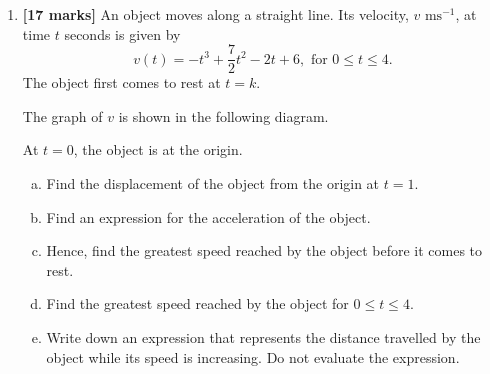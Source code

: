 \documentclass[12pt, twoside]{article}
\begin{document}
\begin{enumerate}
    Consider a geometric sequence, $v_n$, where $v_2 = u_1$ and $v_4 = u_6$.
    
    \begin{enumerate}[(a)]
        \setcounter{enumii}{3}
        \item Find the possible values of the common ratio, $r$.
        \item Given that $v_{99} < 0$, find $v_5$.
    \end{enumerate}

\vspace{1cm}

\item \textbf{[17 marks]} An object moves along a straight line. Its velocity, $v\text{ ms}^{-1}$, at time $t$ seconds is given by
\[
v(t) = -t^3 + \frac{7}{2}t^2 - 2t + 6, \text{ for } 0 \leq t \leq 4.
\]
The object first comes to rest at $t = k$.

The graph of $v$ is shown in the following diagram.

\begin{center}
\end{center}

At $t = 0$, the object is at the origin.

    \begin{enumerate}[(a)]
        \item Find the displacement of the object from the origin at $t = 1$.
        \item Find an expression for the acceleration of the object.
        \item Hence, find the greatest speed reached by the object before it comes to rest.
        \item Find the greatest speed reached by the object for $0 \leq t \leq 4$.
        \item Write down an expression that represents the distance travelled by the object while its speed is increasing. Do not evaluate the expression.
    \end{enumerate}

\end{enumerate}
\end{document}

